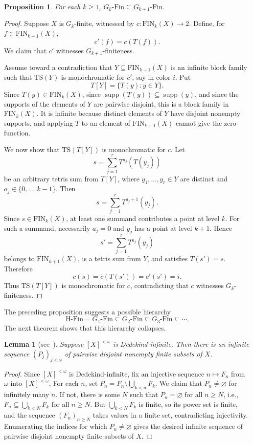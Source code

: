 \documentclass[11pt]{amsart}
\newtheorem{proposition}[theorem]{Proposition}
\newtheorem{lemma}[theorem]{Lemma}
\theoremstyle{definition}
\DeclareMathOperator{\supp}{supp}
\newcommand{\Fin}{\mathrm{Fin}}
\newcommand{\HFin}{\mathrm{H\text{-}Fin}}
\newcommand{\FIN}{\mathrm{FIN}}
\newcommand{\TS}{\mathrm{TS}}
\begin{document}
\begin{proposition}\label{prop:gk-monotone}
For each \(k\geq 1\), \(G_k\text{-}\Fin\subseteq G_{k+1}\text{-}\Fin\).
\end{proposition}

\begin{proof}
Suppose \(X\) is \(G_k\)-finite, witnessed by \(c:\FIN_k(X)\to 2\).  Define, for \(f\in\FIN_{k+1}(X)\),
\[
    c'(f)=c(T(f)).
\]
We claim that \(c'\) witnesses \(G_{k+1}\)-finiteness.

Assume toward a contradiction that \(Y\subseteq\FIN_{k+1}(X)\) is an infinite block family such that \(\TS(Y)\) is monochromatic for \(c'\), say in color \(i\).  Put
\[
    T[Y]=\{T(y):y\in Y\}.
\]
Since \(T(y)\in\FIN_k(X)\), since \(\supp(T(y))\subseteq\supp(y)\), and since the supports of the elements of \(Y\) are pairwise disjoint, this is a block family in \(\FIN_k(X)\).  It is infinite because distinct elements of \(Y\) have disjoint nonempty supports, and applying \(T\) to an element of \(\FIN_{k+1}(X)\) cannot give the zero function.

We now show that \(\TS(T[Y])\) is monochromatic for \(c\).  Let
\[
    s=\sum_{j=1}^r T^{a_j}(T(y_j))
\]
be an arbitrary tetris sum from \(T[Y]\), where \(y_1,\dots,y_r\in Y\) are distinct and \(a_j\in\{0,\dots,k-1\}\).  Then
\[
    s=\sum_{j=1}^r T^{a_j+1}(y_j).
\]
Since \(s\in\FIN_k(X)\), at least one summand contributes a point at level \(k\).  For such a summand, necessarily \(a_j=0\) and \(y_j\) has a point at level \(k+1\).  Hence
\[
    s'=\sum_{j=1}^r T^{a_j}(y_j)
\]
belongs to \(\FIN_{k+1}(X)\), is a tetris sum from \(Y\), and satisfies \(T(s')=s\).  Therefore
\[
    c(s)=c(T(s'))=c'(s')=i.
\]
Thus \(\TS(T[Y])\) is monochromatic for \(c\), contradicting that \(c\) witnesses \(G_k\)-finiteness.
\end{proof}

The preceding proposition suggests a possible hierarchy
\[
    \HFin=G_1\text{-}\Fin\subseteq G_2\text{-}\Fin\subseteq G_3\text{-}\Fin\subseteq\cdots.
\]
The next theorem shows that this hierarchy collapses.

\begin{lemma}[{see\ \cite[Theorem~3.2]{BCF}}]\label{lem:disjoint-pieces}
Suppose \([X]^{<\omega}\) is Dedekind-infinite.  Then there is an infinite sequence \((P_j)_{j<\omega}\) of pairwise disjoint nonempty finite subsets of \(X\).
\end{lemma}

\begin{proof}
Since \([X]^{<\omega}\) is Dedekind-infinite, fix an injective sequence \(n\longmapsto F_n\) from \(\omega\) into \([X]^{<\omega}\).  For each \(n\), set \(P_n=F_n\setminus\bigcup_{k<n}F_k\).  We claim that \(P_n\neq\varnothing\) for infinitely many \(n\).  If not, there is some \(N\) such that \(P_n=\varnothing\) for all \(n\geq N\), i.e., \(F_n\subseteq\bigcup_{k<N}F_k\) for all \(n\geq N\).  But \(\bigcup_{k<N}F_k\) is finite, so its power set is finite, and the sequence \((F_n)_{n\geq N}\) takes values in a finite set, contradicting injectivity.  Enumerating the indices for which \(P_n\neq\varnothing\) gives the desired infinite sequence of pairwise disjoint nonempty finite subsets of \(X\).
\end{proof}
\end{document}
